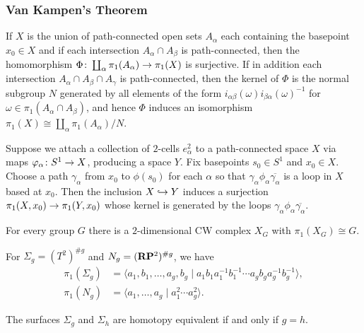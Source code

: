 \subsubsection{Van Kampen's Theorem}

\begin{theorem}
  If $X$ is the union of path-connected open sets $A_\alpha$ each containing the basepoint $x_0 \in X$ and if each intersection $A_\alpha \cap A_\beta$ is path-connected, then the homomorphism $\Phi \colon \coprod_\alpha \pi_1(A_\alpha) \rightarrow \pi_1(X)$ is surjective. If in addition each intersection $A_\alpha \cap A_\beta \cap A_\gamma$ is path-connected, then the kernel of $\Phi$ is the normal subgroup $N$ generated by all elements of the form $i_{\alpha\beta}(\omega)i_{\beta\alpha}(\omega)^{-1}$ for $\omega \in \pi_1(A_\alpha \cap A_\beta)$, and hence $\Phi$ induces an isomorphism $\pi_1(X) \cong \coprod_\alpha \pi_1(A_\alpha)/N$.
\end{theorem}

\begin{proposition}
  Suppose we attach a collection of $2$-cells $e_\alpha^2$ to a path-connected space $X$ via maps $\varphi_\alpha \colon S^1 \rightarrow X$, producing a space $Y$. Fix basepoints $s_0 \in S^1$ and $x_0 \in X$. Choose a path $\gamma_\alpha$ from $x_0$ to $\phi(s_0)$ for each $\alpha$ so that $\gamma_\alpha \phi_\alpha \overline{\gamma_\alpha}$ is a loop in $X$ based at $x_0$. Then the inclusion $X \hookrightarrow Y$ induces a surjection $\pi_1(X,x_0) \rightarrow \pi_1(Y,x_0)$ whose kernel is generated by the loops $\gamma_\alpha \phi_\alpha \overline{\gamma_\alpha}$.
\end{proposition}

\begin{corollary}
  For every group $G$ there is a $2$-dimensional CW complex $X_G$ with $\pi_1(X_G) \cong G$.
\end{corollary}

For $\Sigma_g = (T^2)^{\# g}$ and $N_g = (\mathbf{R}\mathbf{P}^2)^{\# g}$, we have
\begin{align*}
  \pi_1(\Sigma_g) &= \langle a_1, b_1, \dots, a_g, b_g \;|\; a_1 b_1 a_1^{-1} b_1^{-1} \cdots a_g b_g a_g^{-1} b_g^{-1} \rangle, \\
  \pi_1(N_g) &= \langle a_1, \dots, a_g \;|\; a_1^2 \cdots a_g^2 \rangle.
\end{align*}

\begin{corollary}
  The surfaces $\Sigma_g$ and $\Sigma_h$ are homotopy equivalent if and only if $g = h$.
\end{corollary}

